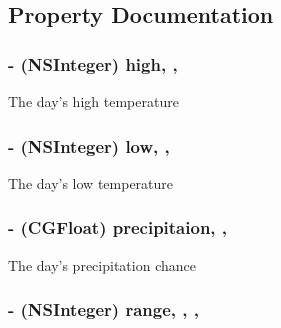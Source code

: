 \subsection{Property Documentation}
\hypertarget{interface_weather_day_a97d5aad192216fe0de9ebc43296cfb68}{
\subsubsection[{high}]{\setlength{\rightskip}{0pt plus 5cm}-\/ (N\-S\-Integer) high\hspace{0.3cm}{\ttfamily [read]}, {\ttfamily [write]}, {\ttfamily [atomic]}}}\label{interface_weather_day_a97d5aad192216fe0de9ebc43296cfb68}
The day's high temperature \hypertarget{interface_weather_day_a677798c5423dabd4861214c5de4faf55}{
\subsubsection[{low}]{\setlength{\rightskip}{0pt plus 5cm}-\/ (N\-S\-Integer) low\hspace{0.3cm}{\ttfamily [read]}, {\ttfamily [write]}, {\ttfamily [atomic]}}}\label{interface_weather_day_a677798c5423dabd4861214c5de4faf55}
The day's low temperature \hypertarget{interface_weather_day_a62a56a8c78976523287185d6dce106e1}{
\subsubsection[{precipitaion}]{\setlength{\rightskip}{0pt plus 5cm}-\/ (C\-G\-Float) precipitaion\hspace{0.3cm}{\ttfamily [read]}, {\ttfamily [write]}, {\ttfamily [atomic]}}}\label{interface_weather_day_a62a56a8c78976523287185d6dce106e1}
The day's precipitation chance \hypertarget{interface_weather_day_ade050fc16334cf7cac350d222ff1a026}{
\subsubsection[{range}]{\setlength{\rightskip}{0pt plus 5cm}-\/ (N\-S\-Integer) range\hspace{0.3cm}{\ttfamily [read]}, {\ttfamily [write]}, {\ttfamily [nonatomic]}, {\ttfamily [assign]}}}\label{interface_weather_day_ade050fc16334cf7cac350d222ff1a026}
